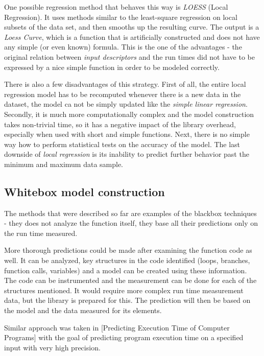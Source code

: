 One possible regression method that behaves this way is \textit{LOESS} (Local Regression). It uses methods similar to the least-square regression on local subsets of the data set, and then smooths up the resulting curve. The output is a \textit{Loess Curve}, which is a function that is artificially constructed and does not have any simple (or even known) formula. This is the one of the advantages - the original relation between \textit{input descriptors} and the run times did not have to be expressed by a nice simple function in order to be modeled correctly.


There is also a few disadvantages of this strategy. First of all, the entire local regression model has to be recomputed whenever there is a new data in the dataset, the model ca not be simply updated like the \textit{simple linear regression}. Secondly, it is much more computationally complex and the model construction takes non-trivial time, so it has a negative impact of the library overhead, especially when used with short and simple functions. Next, there is no simple way how to perform statistical tests on the accuracy of the model. The last downside of \textit{local regression} is its inability to predict further behavior past the minimum and maximum data sample.

\subsection{Whitebox model construction}

The methods that were described so far are examples of the blackbox techniques - they does not analyze the function itself, they base all their predictions only on the run time measured.

More thorough predictions could be made after examining the function code as well. It can be analyzed, key structures in the code identified (loops, branches, function calls, variables) and a model can be created using these information. The code can be instrumented and the measurement can be done for each of the structures mentioned. It would require more complex run time measurement data, but the library is prepared for this. The prediction will then be based on the model and the data measured for its elements.

Similar approach was taken in [Predicting Execution Time of Computer Programs] with the goal of predicting program execution time on a specified input with very high precision.

